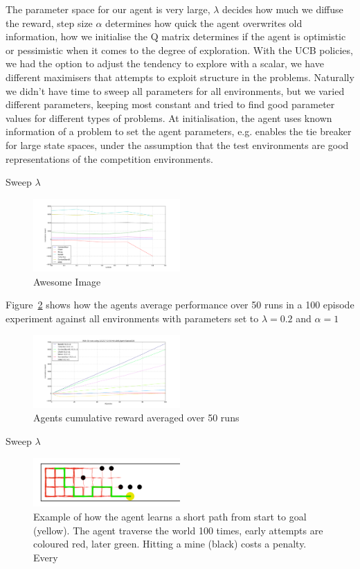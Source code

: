 The parameter space for our agent is very large, $\lambda$ decides how much we diffuse the reward, step size $\alpha$ determines how quick the agent overwrites old information, how we initialise the Q matrix determines if the agent is optimistic or pessimistic when it comes to the degree of exploration. With the UCB policies, we had the option to adjust the tendency to explore with a scalar, we have different maximisers that attempts to exploit structure in the problems. Naturally we didn't have time to sweep all parameters for all environments, but we varied different parameters, keeping most constant and tried to find good parameter values for different types of problems. At initialisation, the agent uses known information of a problem to set the agent parameters, e.g. enables the tie breaker for large state spaces, under the assumption that the test environments are good representations of the competition environments.

Sweep $\lambda$
\begin{figure}[h]
    \centering
    \includegraphics[width=0.5\textwidth]{../data/lambdasweepplot.png}
    \caption{Awesome Image}
    \label{fig:awesome_image}
\end{figure}


Figure~\ref{fig:cumreward} shows how the agents average performance over 50 runs in a 100 episode experiment against all environments with parameters set to $\lambda = 0.2$ and $\alpha = 1$

\begin{figure}[h!]
    \centering
    \includegraphics[width=0.5\textwidth]{../data/100episodes_50runs.png}
    \caption{Agents cumulative reward averaged over 50 runs}
    \label{fig:cumreward}
\end{figure}

Sweep $\lambda$
\begin{figure}[h]
    \centering
    \includegraphics[width=0.5\textwidth]{../data/minPlot.png}
    \caption{Example of how the agent learns a short path from start to goal (yellow). The agent traverse the world 100 times, early attempts are coloured red, later green. Hitting a mine (black) costs a penalty. Every  }
    \label{fig:awesome_image}
\end{figure}

